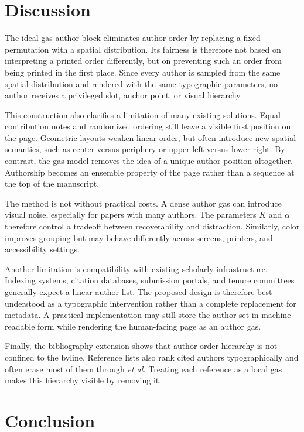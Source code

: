 \documentclass[10pt,letterpaper]{article}
\theoremstyle{definition}
\theoremstyle{remark}
\begin{document}
\section{Discussion}

The ideal-gas author block eliminates author order by replacing a fixed permutation with a spatial distribution. Its fairness is therefore not based on interpreting a printed order differently, but on preventing such an order from being printed in the first place. Since every author is sampled from the same spatial distribution and rendered with the same typographic parameters, no author receives a privileged slot, anchor point, or visual hierarchy.

This construction also clarifies a limitation of many existing solutions. Equal-contribution notes and randomized ordering still leave a visible first position on the page. Geometric layouts weaken linear order, but often introduce new spatial semantics, such as center versus periphery or upper-left versus lower-right. By contrast, the gas model removes the idea of a unique author position altogether. Authorship becomes an ensemble property of the page rather than a sequence at the top of the manuscript.

The method is not without practical costs. A dense author gas can introduce visual noise, especially for papers with many authors. The parameters $K$ and $\alpha$ therefore control a tradeoff between recoverability and distraction. Similarly, color improves grouping but may behave differently across screens, printers, and accessibility settings. 

Another limitation is compatibility with existing scholarly infrastructure. Indexing systems, citation databases, submission portals, and tenure committees generally expect a linear author list. The proposed design is therefore best understood as a typographic intervention rather than a complete replacement for metadata. A practical implementation may still store the author set in machine-readable form while rendering the human-facing page as an author gas.

Finally, the bibliography extension shows that author-order hierarchy is not confined to the byline. Reference lists also rank cited authors typographically and often erase most of them through \textit{et al.} Treating each reference as a local gas makes this hierarchy visible by removing it. 

\section{Conclusion}
\end{document}
